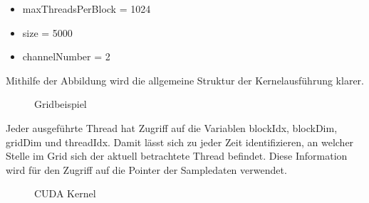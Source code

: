 \begin{itemize}
	\item maxThreadsPerBlock = 1024
	\item size = 5000
	\item channelNumber = 2
\end{itemize}

Mithilfe der Abbildung wird die allgemeine Struktur der Kernelausführung klarer.

\begin{figure}[hbt!]
	\centering      
	\def\svgscale{0.75}
	
	\caption{Gridbeispiel}
	\label{fig:exampleGrid}
\end{figure}

Jeder ausgeführte Thread hat Zugriff auf die Variablen blockIdx, blockDim, gridDim und threadIdx. Damit lässt sich zu jeder Zeit identifizieren, an welcher Stelle im Grid sich der aktuell betrachtete Thread befindet. Diese Information wird für den Zugriff auf die Pointer der Sampledaten verwendet. 

\begin{figure}[t!]
	
	\caption{CUDA Kernel}
	\label{fig:cudaKernel}
\end{figure}

